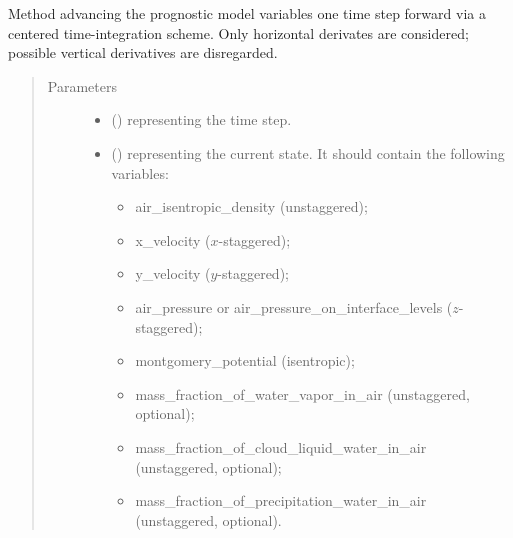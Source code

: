 \documentclass[letterpaper,10pt,english]{sphinxmanual}
\begin{document}
\begin{fulllineitems}
\begin{fulllineitems}
\label{\detokenize{api:tasmania.dycore.prognostic_isentropic_nonconservative_centered.PrognosticIsentropicNonconservativeCentered.step_neglecting_vertical_advection}}
Method advancing the prognostic model variables one time step forward via a centered time-integration
scheme. Only horizontal derivates are considered; possible vertical derivatives are disregarded.
\begin{quote}\begin{description}
\item[{Parameters}] \leavevmode\begin{itemize}
\item {} 
 () \textendash{}  representing the time step.

\item {} 
 () \textendash{} 
{\hyperref[\detokenize{api:tasmania.storages.state_isentropic.StateIsentropic}]{}} representing the current state.
It should contain the following variables:
\begin{itemize}
\item {} 
air\_isentropic\_density (unstaggered);

\item {} 
x\_velocity (\(x\)-staggered);

\item {} 
y\_velocity (\(y\)-staggered);

\item {} 
air\_pressure or air\_pressure\_on\_interface\_levels (\(z\)-staggered);

\item {} 
montgomery\_potential (isentropic);

\item {} 
mass\_fraction\_of\_water\_vapor\_in\_air (unstaggered, optional);

\item {} 
mass\_fraction\_of\_cloud\_liquid\_water\_in\_air (unstaggered, optional);

\item {} 
mass\_fraction\_of\_precipitation\_water\_in\_air (unstaggered, optional).


\end{itemize}
\end{itemize}
\end{description}
\end{quote}
\end{fulllineitems}
\end{fulllineitems}
\end{document}
